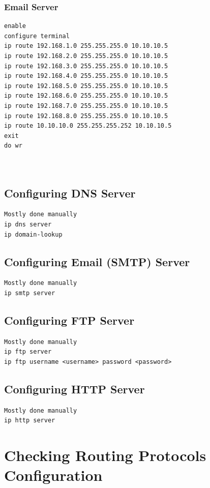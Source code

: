 \documentclass[12pt]{article}
\begin{document}
\subsubsection{Email Server}
\begin{verbatim}
enable
configure terminal
ip route 192.168.1.0 255.255.255.0 10.10.10.5
ip route 192.168.2.0 255.255.255.0 10.10.10.5
ip route 192.168.3.0 255.255.255.0 10.10.10.5
ip route 192.168.4.0 255.255.255.0 10.10.10.5
ip route 192.168.5.0 255.255.255.0 10.10.10.5
ip route 192.168.6.0 255.255.255.0 10.10.10.5
ip route 192.168.7.0 255.255.255.0 10.10.10.5
ip route 192.168.8.0 255.255.255.0 10.10.10.5
ip route 10.10.10.0 255.255.255.252 10.10.10.5
exit
do wr



\end{verbatim}



\subsection{Configuring DNS Server}
\begin{verbatim}
Mostly done manually
ip dns server
ip domain-lookup
\end{verbatim}

\subsection{Configuring Email (SMTP) Server}
\begin{verbatim}
Mostly done manually
ip smtp server
\end{verbatim}

\subsection{Configuring FTP Server}
\begin{verbatim}
Mostly done manually
ip ftp server
ip ftp username <username> password <password>
\end{verbatim}

\subsection{Configuring HTTP Server}
\begin{verbatim}
Mostly done manually
ip http server
\end{verbatim}

\section{Checking Routing Protocols Configuration}
\end{document}
